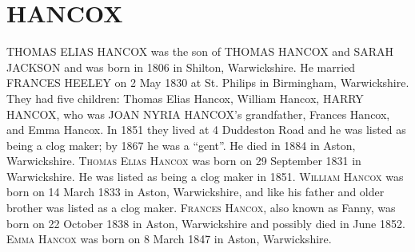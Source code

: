 \section{HANCOX}

\uppercase{Thomas Elias Hancox} was the son of \uppercase{Thomas Hancox} and \uppercase{Sarah Jackson} and was born in 1806 in Shilton, Warwickshire.  He married \uppercase{Frances Heeley} on	2 May 1830 at St. Philips in	Birmingham, Warwickshire. They had five children: Thomas Elias Hancox, William Hancox, \uppercase{Harry Hancox}, who was \uppercase{Joan Nyria Hancox}'s grandfather, Frances Hancox, and Emma Hancox.  In 1851 they lived at 4 Duddeston Road and he was listed as being a clog maker; by 1867 he was a ``gent''. He died in 1884 in Aston, Warwickshire.
\textsc{Thomas Elias Hancox} was born on 29 September 1831 in	Warwickshire. He was listed as being a clog maker in 1851.
\textsc{William Hancox} was born on 14 March 1833 in Aston, Warwickshire, and like his father and older brother was listed as a clog maker.
\textsc{Frances Hancox}, also known as Fanny, was born on 22 October 1838 in Aston, Warwickshire and possibly died in June 1852.
\textsc{Emma Hancox} was born on	8 March 1847 in	Aston, Warwickshire.

